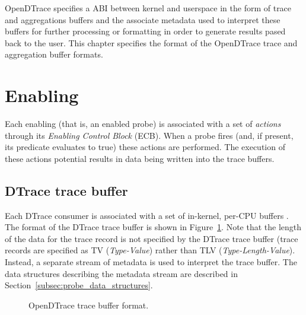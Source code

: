 OpenDTrace specifies a ABI between kernel and userspace in the form of trace
and aggregations buffers and the associate metadata used to interpret these
buffers for further processing or formatting in order to generate results pased
back to the user. This chapter specifies the format of the OpenDTrace trace
and aggregation buffer formats.

\section{Enabling}
\label{sec:probes}

Each enabling (that is, an enabled probe) is associated with a set of
\textit{actions} through its \textit{Enabling Control Block} (ECB). When a
probe fires (and, if present, its predicate evaluates to true) these
actions are performed.  The execution of these actions potential results in
data being written into the trace buffers.

\subsection{DTrace trace buffer}
\label{subsec:trace_buffer}

Each DTrace consumer is associated with a set of in-kernel, per-CPU buffers
\cite{DTrace2004}.  The format of the DTrace trace buffer is shown in
Figure~\ref{fig:trace_buffer}.  Note that the length of the data for the trace
record is not specified by the DTrace trace buffer (trace records are specified
as TV (\textit{Type-Value}) rather than TLV (\textit{Type-Length-Value}).
Instead, a separate stream of metadata is used to interpret the trace buffer.
The data structures describing the metadata stream are described in
Section~\ref{subsec:probe_data_structures}.

\begin{figure}[!ht]
	\centering
	\caption{OpenDTrace trace buffer format.}
	\label{fig:trace_buffer}
\end{figure}

